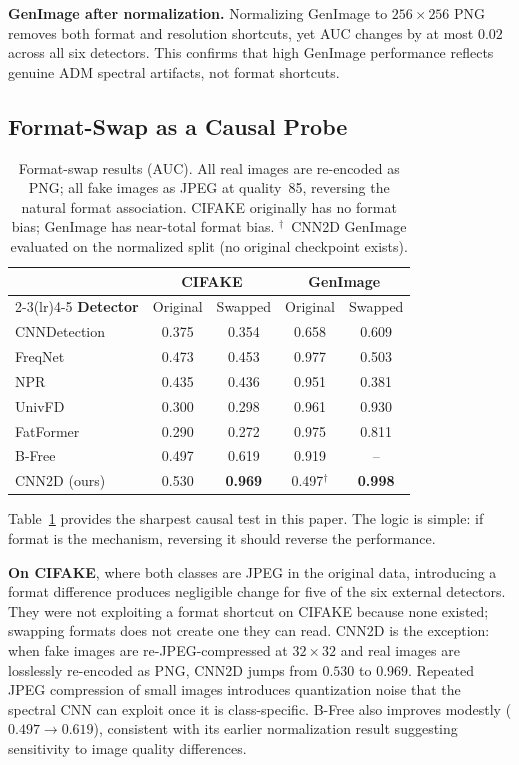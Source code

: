\documentclass{article}
\begin{document}
\noindent\textbf{GenImage after normalization.}
Normalizing GenImage to $256\times256$ PNG removes both format and resolution shortcuts, yet AUC changes by at most $0.02$ across all six detectors.
This confirms that high GenImage performance reflects genuine ADM spectral artifacts, not format shortcuts.


\subsection{Format-Swap as a Causal Probe}

\begin{table}[t]
\centering
\small
\setlength{\tabcolsep}{4pt}
\begin{tabular}{lcccc}
\toprule
 & \multicolumn{2}{c}{\textbf{CIFAKE}} & \multicolumn{2}{c}{\textbf{GenImage}} \\
\cmidrule(lr){2-3}\cmidrule(lr){4-5}
\textbf{Detector} & Original & Swapped & Original & Swapped \\
\midrule
CNNDetection~\cite{wang2020cnn} & 0.375 & 0.354 & 0.658 & 0.609 \\
FreqNet~\cite{freqnet}          & 0.473 & 0.453 & 0.977 & 0.503 \\
NPR~\cite{npr}                  & 0.435 & 0.436 & 0.951 & 0.381 \\
UnivFD~\cite{univfd}            & 0.300 & 0.298 & 0.961 & 0.930 \\
FatFormer~\cite{fatformer}      & 0.290 & 0.272 & 0.975 & 0.811 \\
B-Free~\cite{bfree}             & 0.497 & 0.619 & 0.919 & --    \\
CNN2D (ours)                    & 0.530 & \textbf{0.969} & 0.497$^\dag$ & \textbf{0.998} \\
\bottomrule
\end{tabular}
\caption{Format-swap results (AUC). All real images are re-encoded as PNG; all fake images as JPEG at quality~85, reversing the natural format association. CIFAKE originally has no format bias; GenImage has near-total format bias. $^\dag$~CNN2D GenImage evaluated on the normalized split (no original checkpoint exists).}
\label{tab:swap}
\end{table}

Table~\ref{tab:swap} provides the sharpest causal test in this paper.
The logic is simple: if format is the mechanism, reversing it should reverse the performance.

\noindent\textbf{On CIFAKE}, where both classes are JPEG in the original data, introducing a format difference produces negligible change for five of the six external detectors.
They were not exploiting a format shortcut on CIFAKE because none existed; swapping formats does not create one they can read.
CNN2D is the exception: when fake images are re-JPEG-compressed at $32\times32$ and real images are losslessly re-encoded as PNG, CNN2D jumps from $0.530$ to $0.969$.
Repeated JPEG compression of small images introduces quantization noise that the spectral CNN can exploit once it is class-specific.
B-Free also improves modestly ($0.497\to0.619$), consistent with its earlier normalization result suggesting sensitivity to image quality differences.
\end{document}
